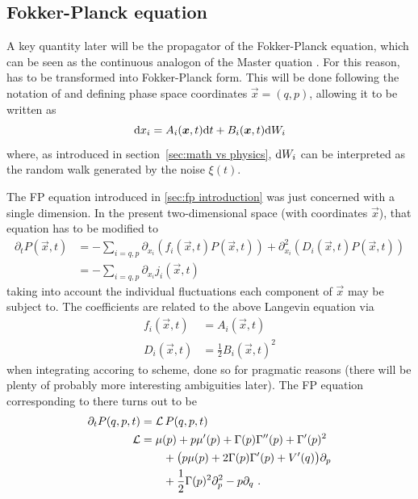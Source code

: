 \subsection{Fokker-Planck equation}

A key quantity later will be the propagator of the Fokker-Planck equation, which can be seen as the continuous analogon of the Master quation . For this reason,  has to be transformed into Fokker-Planck form. This will be done following the notation of  and defining phase space coordinates \(\vec x = (q,p)\), allowing it to be written as
%
\begin{equation}
	\mathrm{d} x_i = A_i(\boldsymbol{x},t)\mathrm{d} t + B_i(\boldsymbol{x}, t)\mathrm{d} W_i
\end{equation}
%
where, as introduced in section~\ref{sec:math vs physics}, \(\mathrm{d} W_i\) can be interpreted as the random walk generated by the noise \(\xi(t)\).

The FP equation introduced in \ref{sec:fp introduction} was just concerned with a single dimension. In the present two-dimensional space (with coordinates \(\vec x\)), that equation has to be modified to
%
\begin{align}
	\label{eqn:fp phase}
	\partial_tP(\vec x,t)
	&= - \sum_{i=q,p} \partial_{x_i} (f_i(\vec x,t)P(\vec x,t)) + \partial_{x_i}^2 (D_i(\vec x,t)P(\vec x,t)) \\
	&= - \sum_{i=q,p} \partial_{x_i}j_i(\vec x,t)
\end{align}
%
taking into account the individual fluctuations each component of \(\vec x\) may be subject to. The coefficients are related to the above Langevin equation via
%
\begin{align}
	f_i(\vec x,t) &= A_i(\vec x,t) \\
	D_i(\vec x,t) &= \frac12B_i(\vec x,t)^2
\end{align}
%
when integrating accoring to \Ito{} scheme, done so for pragmatic reasons (there will be plenty of probably more interesting ambiguities later).
The FP equation corresponding to  there turns out to be
%
\begin{equation}\begin{split}
	\partial_t P(q,p,t) &= \mathcal{L} \, P(q,p,t) \\
	\mathcal{L} &= \mu(p)+p\mu'(p) + \Gamma(p)\Gamma''(p) + \Gamma'(p)^2 \\
	&\qquad +\bigl(p\mu(p) + 2\Gamma(p)\Gamma'(p) + V'(q)\bigr)\partial_p \\
	&\qquad +\frac12\Gamma(p)^2\partial_p^2 - p\partial_q ~.
\end{split}\end{equation}







